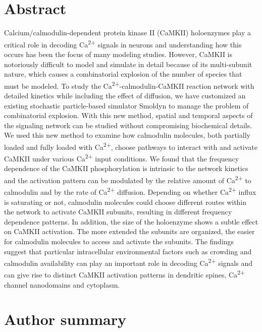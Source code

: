 \documentclass[10pt,letterpaper]{article}
\begin{document}
\section*{Abstract}
Calcium/calmodulin-dependent protein kinase II (CaMKII) holoenzymes play a critical role in decoding Ca\textsuperscript{2+} signals in neurons and understanding how this occurs has been the focus of many modeling studies. However, CaMKII is notoriously difficult to model and simulate in detail because of its multi-subunit nature, which causes a combinatorial explosion of the number of species that must be modeled. To study the Ca\textsuperscript{2+}-calmodulin-CaMKII reaction network with detailed kinetics while including the effect of diffusion, we have customized an existing stochastic particle-based simulator Smoldyn to manage the problem of combinatorial explosion. With this new method, spatial and temporal aspects of the signaling network can be studied without compromising biochemical details. We used this new method to examine how calmodulin molecules, both partially loaded and fully loaded with Ca\textsuperscript{2+}, choose pathways to interact with and activate CaMKII under various Ca\textsuperscript{2+} input conditions. We found that the frequency dependence of the CaMKII phosphorylation is intrinsic to the network kinetics and the activation pattern can be modulated by the relative amount of Ca\textsuperscript{2+} to calmodulin and by the rate of Ca\textsuperscript{2+} diffusion. Depending on whether Ca\textsuperscript{2+} influx is saturating or not, calmodulin molecules could choose different routes within the network to activate CaMKII subunits, resulting in different frequency dependence patterns. In addition, the size of the holoenzyme shows a subtle effect on CaMKII activation. The more extended the subunits are organized, the easier for calmodulin molecules to access and activate the subunits. The findings suggest that particular intracellular environmental factors such as crowding and calmodulin availability can play an important role in decoding Ca\textsuperscript{2+} signals and can give rise to distinct CaMKII activation patterns in dendritic spines, Ca\textsuperscript{2+} channel nanodomains and cytoplasm.
\section*{Author summary}
\end{document}
